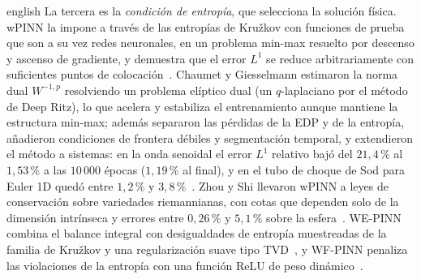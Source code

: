 \documentclass[0000.tex]{subfiles}
\begin{document}
\begin{hyphenrules}{english}
La tercera es la \emph{condición de entropía}, que selecciona la solución física. wPINN la impone a través de las entropías de Kružkov con funciones de prueba que son a su vez redes neuronales, en un problema min-max resuelto por descenso y ascenso de gradiente, y demuestra que el error $L^1$ se reduce arbitrariamente con suficientes puntos de colocación~\cite{de2024wpinns}. Chaumet y Giesselmann estimaron la norma dual $W^{-1,p}$ resolviendo un problema elíptico dual (un $q$-laplaciano por el método de Deep Ritz), lo que acelera y estabiliza el entrenamiento aunque mantiene la estructura min-max; además separaron las pérdidas de la EDP y de la entropía, añadieron condiciones de frontera débiles y segmentación temporal, y extendieron el método a sistemas: en la onda senoidal el error $L^1$ relativo bajó del $21{,}4\,\%$ al $1{,}53\,\%$ a las $10\,000$ épocas ($1{,}19\,\%$ al final), y en el tubo de choque de Sod para Euler 1D quedó entre $1{,}2\,\%$ y $3{,}8\,\%$~\cite{chaumet2024improving}. Zhou y Shi llevaron wPINN a leyes de conservación sobre variedades riemannianas, con cotas que dependen solo de la dimensión intrínseca y errores entre $0{,}26\,\%$ y $5{,}1\,\%$ sobre la esfera~\cite{zhou2025weak}. WE-PINN combina el balance integral con desigualdades de entropía muestreadas de la familia de Kružkov y una regularización suave tipo TVD~\cite{oubarka2026weak}, y WF-PINN penaliza las violaciones de la entropía con una función ReLU de peso dinámico~\cite{wang2025wf}.


\end{hyphenrules}
\end{document}
